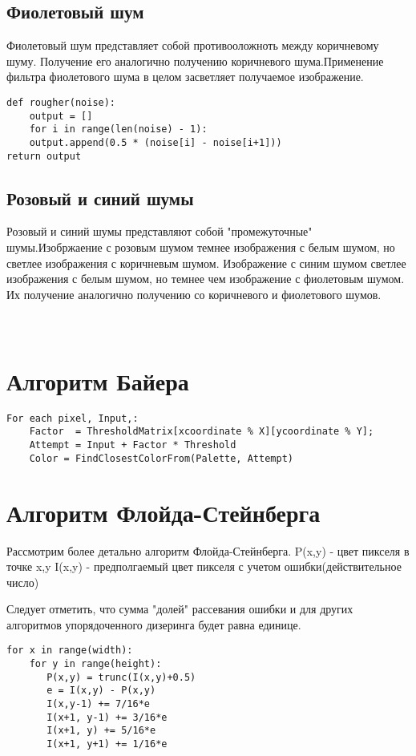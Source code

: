 \subsection{Фиолетовый шум}
Фиолетовый  шум представляет собой противооложноть между коричневому шуму. Получение его аналогично получению коричневого шума.Применение фильтра фиолетового шума в целом засветляет получаемое изображение.

\begin{lstlisting}[style=pseudocode,caption={Получение розового шума}]
def rougher(noise):
    output = []
    for i in range(len(noise) - 1):
    output.append(0.5 * (noise[i] - noise[i+1]))
return output
\end{lstlisting}

\subsection{Розовый и синий шумы}
Розовый и синий шумы представляют собой "промежуточные" шумы.Изобржаение с розовым шумом темнее  изображения с белым шумом, но светлее изображения с коричневым шумом. Изображение с синим шумом светлее изображения с белым шумом, но темнее чем изображение с фиолетовым шумом. Их получение аналогично получению со коричневого и фиолетового шумов.
\\
\\
\\

\section{Алгоритм Байера}
  
  \begin{lstlisting}[style=pseudocode,caption={Алгоритм Флойда-Стейнберга}]
For each pixel, Input,:
    Factor  = ThresholdMatrix[xcoordinate % X][ycoordinate % Y];
    Attempt = Input + Factor * Threshold
    Color = FindClosestColorFrom(Palette, Attempt)
  \end{lstlisting}
\section{Алгоритм Флойда-Стейнберга}
Рассмотрим более детально алгоритм Флойда-Стейнберга.
P(x,y) - цвет пикселя в точке x,y
I(x,y) - предполгаемый цвет пикселя с учетом ошибки(действительное число)

Следует отметить, что сумма "долей" рассевания ошибки и для других алгоритмов упорядоченного дизеринга будет равна единице.
\begin{lstlisting}[style=pseudocode,caption={Алгоритм Флойда-Стейнберга}]
for x in range(width):
    for y in range(height):
       P(x,y) = trunc(I(x,y)+0.5)
       e = I(x,y) - P(x,y)
       I(x,y-1) += 7/16*e
       I(x+1, y-1) += 3/16*e
       I(x+1, y) += 5/16*e
       I(x+1, y+1) += 1/16*e
\end{lstlisting}
